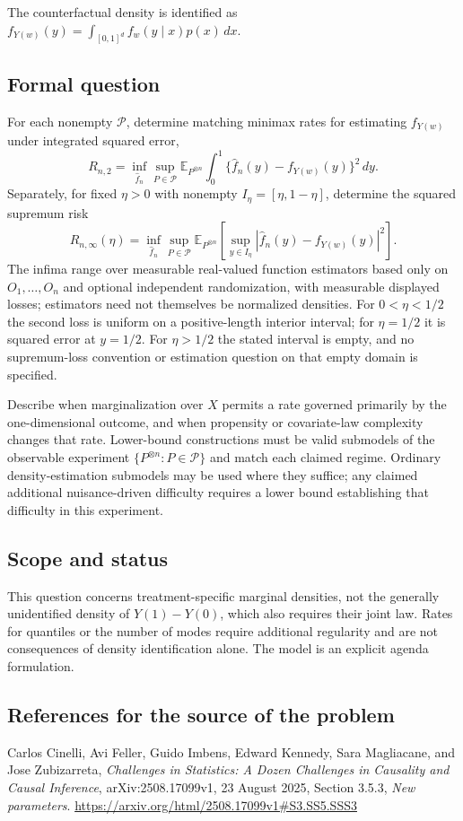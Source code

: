 \documentclass[11pt,a4paper]{article}
\newcommand{\E}{\mathbb E}
\begin{document}
The counterfactual density is identified as
$f_{Y(w)}(y)=\int_{[0,1]^d} f_w(y\mid x)p(x)\,dx$.
\subsection*{Formal question}
For each nonempty $\mathcal P$, determine matching minimax rates for estimating $f_{Y(w)}$ under integrated squared error,
\[
 R_{n,2}=\inf_{\widehat f_n}\sup_{P\in\mathcal P}
 \E_{P^{\otimes n}}\int_0^1\{\widehat f_n(y)-f_{Y(w)}(y)\}^2\,dy.
\]
Separately, for fixed $\eta>0$ with nonempty $I_\eta=[\eta,1-\eta]$, determine the squared supremum risk
\[
 R_{n,\infty}(\eta)=\inf_{\widehat f_n}\sup_{P\in\mathcal P}
 \E_{P^{\otimes n}}\left[\sup_{y\in I_\eta}
 |\widehat f_n(y)-f_{Y(w)}(y)|^2\right].
\]
The infima range over measurable real-valued function estimators based only on $O_1,\ldots,O_n$ and optional independent randomization, with measurable displayed losses; estimators need not themselves be normalized densities. For $0<\eta<1/2$ the second loss is uniform on a positive-length interior interval; for $\eta=1/2$ it is squared error at $y=1/2$. For $\eta>1/2$ the stated interval is empty, and no supremum-loss convention or estimation question on that empty domain is specified.

Describe when marginalization over $X$ permits a rate governed primarily by the one-dimensional outcome, and when propensity or covariate-law complexity changes that rate. Lower-bound constructions must be valid submodels of the observable experiment $\{P^{\otimes n}:P\in\mathcal P\}$ and match each claimed regime. Ordinary density-estimation submodels may be used where they suffice; any claimed additional nuisance-driven difficulty requires a lower bound establishing that difficulty in this experiment.
\subsection*{Scope and status}
This question concerns treatment-specific marginal densities, not the generally unidentified density of $Y(1)-Y(0)$, which also requires their joint law. Rates for quantiles or the number of modes require additional regularity and are not consequences of density identification alone. The model is an explicit agenda formulation.
\subsection*{References for the source of the problem}
Carlos Cinelli, Avi Feller, Guido Imbens, Edward Kennedy, Sara Magliacane, and Jose Zubizarreta, \emph{Challenges in Statistics: A Dozen Challenges in Causality and Causal Inference}, arXiv:2508.17099v1, 23 August 2025, Section 3.5.3, \emph{New parameters}.
\url{https://arxiv.org/html/2508.17099v1#S3.SS5.SSS3}
\end{document}
